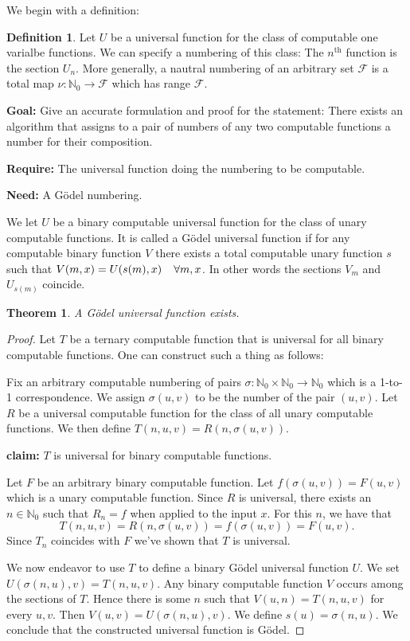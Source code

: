 \documentclass[10pt, letterpaper]{article}
\newcommand{\N}{\mathbb{N}}
\newtheorem{thm}{Theorem}
\theoremstyle{remark}
\theoremstyle{definition}
\newtheorem{defn}{Definition}
\begin{document}
We begin with a definition:

\begin{defn}
    Let $U$ be a universal function for the class of computable one varialbe functions. We can specify a numbering 
    of this class: The $n^{\text{th}}$ function is the section $U_n$. More generally, a nautral numbering 
    of an arbitrary set $\mathscr{F}$ is a total map $\nu:\N_0 \rightarrow \mathscr{F}$ which has range $\mathscr{F}$.
\end{defn}

\textbf{Goal: } Give an accurate formulation and proof for the statement: There exists an algorithm that assigns to a pair
of numbers of any two computable functions a number for their composition.

\textbf{Require: } The universal function doing the numbering to be computable.

\textbf{Need: } A G\"{o}del numbering.

We let $U$ be a binary computable universal function for the class of unary computable functions. It is called a G\"{o}del 
universal function if for any computable binary function $V$ there exists a total computable unary function
$s$ such that $V(m,x) = U(s(m),x) \hspace*{.15in} \forall m,x$. In other words the sections $V_m$ and $U_{s(m)}$ coincide.

\begin{thm}
    A G\"{o}del universal function exists.
\end{thm}

\begin{proof}
    Let $T$ be a ternary computable function that is universal for all binary computable functions. One can construct such a 
    thing as follows:

    Fix an arbitrary computable numbering of pairs $\sigma:\N_0 \times \N_0 \rightarrow \N_0$ which is a 1-to-1 correspondence. We 
    assign $\sigma(u,v)$ to be the number of the pair $(u,v)$. Let $R$ be a universal computable function for the class 
    of all unary computable functions. We then define $T(n,u,v) = R(n, \sigma(u,v))$.

    \textbf{claim: } $T$ is universal for binary computable functions. 

    Let $F$ be an arbitrary binary computable function. Let $f(\sigma(u,v)) = F(u,v)$ which is a unary computable function.
    Since $R$ is universal, there exists an $n \in \N_0$ such that $R_n = f$ when applied to the input $x$. For 
    this $n$, we have that 
    \[
        T(n,u,v) = R(n,\sigma(u,v)) = f(\sigma(u,v)) = F(u,v).
    \]
    Since $T_n$ coincides with $F$ we've shown that $T$ is universal.

    We now endeavor to use $T$ to define a binary G\"{o}del universal function $U$. We set $U(\sigma(n,u),v) = T(n,u,v)$. 
    Any binary computable function $V$ occurs among the sections of $T$. Hence there is some $n$ such that $V(u,n) = T(n,u,v)$
    for every $u,v$. Then $V(u,v)=U(\sigma(n,u),v)$. We define $s(u) = \sigma(n,u)$. We conclude that the constructed universal 
    function is G\"{o}del.
\end{proof}
\end{document}
